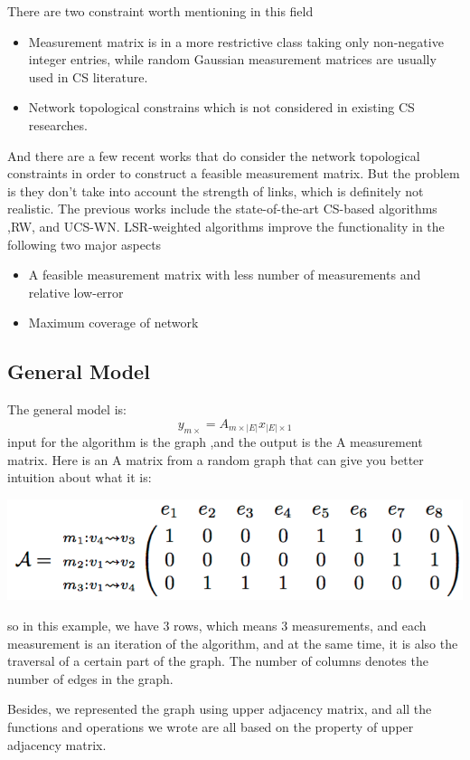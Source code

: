 \documentclass{article}
\begin{document}
There are two constraint worth mentioning in this field
\begin{itemize}
\item Measurement matrix is in a more restrictive class taking only non-negative integer entries, while random Gaussian measurement matrices are usually used in CS literature.
\item Network topological constrains which is not considered in existing CS researches.
\end{itemize}
And there are a few recent works that do consider the network topological constraints in order to construct a feasible measurement matrix. But the problem is they don’t take into account the strength of links, which is definitely not realistic. The previous works include the state-of-the-art CS-based algorithms ,RW, and UCS-WN.
LSR-weighted algorithms improve the functionality in the following two major aspects
\begin{itemize}
\item A feasible measurement matrix with less number of measurements and relative low-error
\item Maximum coverage of network
\end{itemize}


\subsection{General Model}
The general model is:
$$y_{m\times} = A_{m \times |E|}x_{|E|\times1}$$
input for the algorithm is the graph ,and the output is the A measurement matrix. Here is an A matrix from a random graph that can give you better intuition about what it is:

\includegraphics{A_matrix.png}

so in this example, we have 3 rows, which means 3 measurements, and each measurement is an iteration of the algorithm, and at the same time, it is also the traversal of a certain part of the graph. The number of columns denotes the number of edges in the graph.


Besides, we represented the graph using upper adjacency matrix, and all the functions and operations we wrote are all based on the property of upper adjacency matrix.
\end{document}
